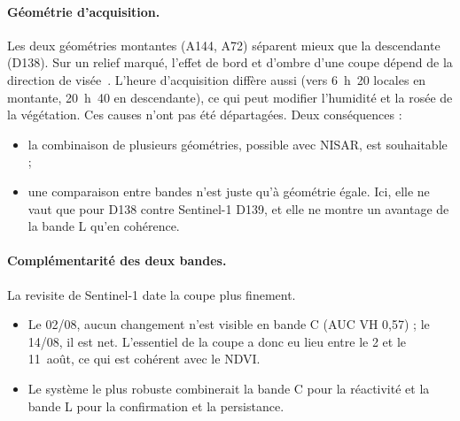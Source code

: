\documentclass[11pt,a4paper]{article}
\begin{document}
\paragraph{Géométrie d'acquisition.} Les deux géométries montantes (A144, A72) séparent mieux que la descendante
(D138). Sur un relief marqué, l'effet de bord et d'ombre d'une coupe dépend de la direction de
visée~\cite{bouvet2018shadow}. L'heure d'acquisition diffère aussi (vers 6~h~20 locales en montante, 20~h~40 en
descendante), ce qui peut modifier l'humidité et la rosée de la végétation. Ces causes n'ont pas été départagées.
Deux conséquences :
\begin{itemize}
\item la combinaison de plusieurs géométries, possible avec NISAR, est souhaitable ;
\item une comparaison entre bandes n'est juste qu'à géométrie égale. Ici, elle ne vaut que pour D138 contre
  Sentinel-1 D139, et elle ne montre un avantage de la bande L qu'en cohérence.
\end{itemize}

\paragraph{Complémentarité des deux bandes.} La revisite de Sentinel-1 date la coupe plus finement.
\begin{itemize}
\item Le 02/08, aucun changement n'est visible en bande C (AUC VH 0,57) ; le 14/08, il est net. L'essentiel de
  la coupe a donc eu lieu entre le 2 et le 11~août, ce qui est cohérent avec le NDVI.
\item Le système le plus robuste combinerait la bande C pour la réactivité et la bande L pour la confirmation et la
  persistance.
\end{itemize}
\end{document}
